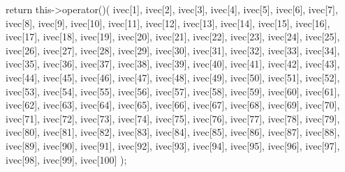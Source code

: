 \begin{DoxyCode}
{
  return this->operator()(
  ivec[1],
  ivec[2],
  ivec[3],
  ivec[4],
  ivec[5],
  ivec[6],
  ivec[7],
  ivec[8],
  ivec[9],
  ivec[10],
  ivec[11],
  ivec[12],
  ivec[13],
  ivec[14],
  ivec[15],
  ivec[16],
  ivec[17],
  ivec[18],
  ivec[19],
  ivec[20],
  ivec[21],
  ivec[22],
  ivec[23],
  ivec[24],
  ivec[25],
  ivec[26],
  ivec[27],
  ivec[28],
  ivec[29],
  ivec[30],
  ivec[31],
  ivec[32],
  ivec[33],
  ivec[34],
  ivec[35],
  ivec[36],
  ivec[37],
  ivec[38],
  ivec[39],
  ivec[40],
  ivec[41],
  ivec[42],
  ivec[43],
  ivec[44],
  ivec[45],
  ivec[46],
  ivec[47],
  ivec[48],
  ivec[49],
  ivec[50],
  ivec[51],
  ivec[52],
  ivec[53],
  ivec[54],
  ivec[55],
  ivec[56],
  ivec[57],
  ivec[58],
  ivec[59],
  ivec[60],
  ivec[61],
  ivec[62],
  ivec[63],
  ivec[64],
  ivec[65],
  ivec[66],
  ivec[67],
  ivec[68],
  ivec[69],
  ivec[70],
  ivec[71],
  ivec[72],
  ivec[73],
  ivec[74],
  ivec[75],
  ivec[76],
  ivec[77],
  ivec[78],
  ivec[79],
  ivec[80],
  ivec[81],
  ivec[82],
  ivec[83],
  ivec[84],
  ivec[85],
  ivec[86],
  ivec[87],
  ivec[88],
  ivec[89],
  ivec[90],
  ivec[91],
  ivec[92],
  ivec[93],
  ivec[94],
  ivec[95],
  ivec[96],
  ivec[97],
  ivec[98],
  ivec[99],
  ivec[100]
  );
}
\end{DoxyCode}
